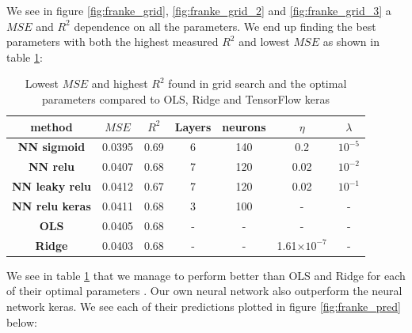 \documentclass[11pt]{article}
\begin{document}
We see in figure \ref{fig:franke_grid}, \ref{fig:franke_grid_2} and \ref{fig:franke_grid_3} a $MSE$ and $R^2$ dependence on all the parameters. We end up finding the best parameters with both the highest measured $R^2$ and lowest $MSE$ as shown in table \ref{tab:franke_best}:
\begin{table}[H]
  \centering
  \caption{Lowest $MSE$ and highest $R^2$ found in grid search and the optimal parameters compared to OLS, Ridge and TensorFlow keras}
  \label{tab:franke_best}
  \begin{tabular}{|c|c|c|c|c|c|c|}
    \hline
    method                 & $MSE$  & $R^2$ & Layers & neurons & $\eta$                & $\lambda$ \\
    \hline
    \textbf{NN sigmoid}    & 0.0395 & 0.69  & 6      & 140     & 0.2                   & $10^{-5}$ \\\hline
    \textbf{NN relu}       & 0.0407 & 0.68  & 7      & 120     & 0.02                  & $10^{-2}$ \\\hline
    \textbf{NN leaky relu} & 0.0412 & 0.67  & 7      & 120     & 0.02                  & $10^{-1}$ \\\hline
    \textbf{NN relu keras} & 0.0411 & 0.68  & 3      & 100     & -                     & -         \\\hline
    \textbf{OLS}           & 0.0405 & 0.68  & -      & -       & -                     & -         \\\hline
    \textbf{Ridge}         & 0.0403 & 0.68  & -      & -       & 1.61$\times 10 ^{-7}$ & -         \\
    \hline
  \end{tabular}
\end{table}
We see in table \ref{tab:franke_best} that we manage to perform better than OLS and Ridge for each of their optimal parameters \cite{project1}. Our own neural network also outperform the neural network keras. We see each of their predictions plotted in figure \ref{fig:franke_pred} below:
\end{document}
